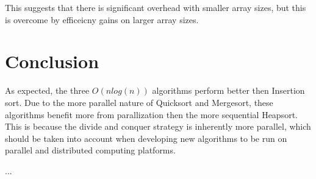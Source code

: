 \documentclass[conference]{IEEEtran}
\begin{document}
This suggests that there is significant overhead with smaller array sizes, but this is overcome by efficeicny gains on larger array sizes. 
\section{Conclusion}
As expected, the three $O(n log(n))$ algorithms perform better then Insertion sort. 
Due to the more parallel nature of Quicksort and Mergesort, these algorithms benefit more from parallization then the more sequential Heapsort. 
This is because the divide and conquer strategy is inherently more parallel, which should be taken into account when developing new algorithms to be run on parallel and distributed computing platforms.

...



\appendix
\end{document}
